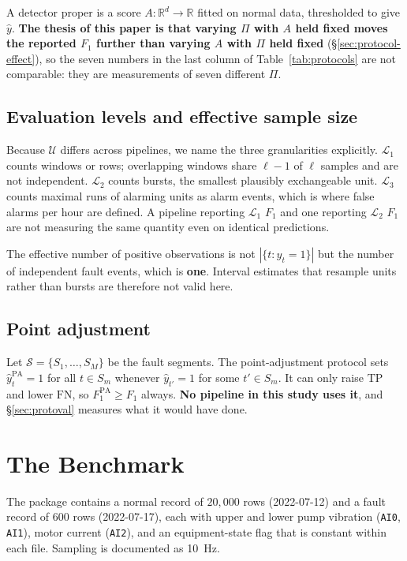 \documentclass{article}
\begin{document}
A detector proper is a score $A:\mathbb{R}^{d}\!\to\mathbb{R}$ fitted on normal
data, thresholded to give $\hat y$. \textbf{The thesis of this paper is that
varying $\Pi$ with $A$ held fixed moves the reported $F_1$ further than varying
$A$ with $\Pi$ held fixed} (\S\ref{sec:protocol-effect}), so the seven
numbers in the last column of Table~\ref{tab:protocols} are not comparable:
they are measurements of seven different $\Pi$.

\subsection{Evaluation levels and effective sample size}
\label{sub:levels}

Because $\mathcal{U}$ differs across pipelines, we name the three granularities
explicitly. $\mathcal{L}_1$ counts windows or rows; overlapping windows share
$\ell-1$ of $\ell$ samples and are not independent. $\mathcal{L}_2$ counts
bursts, the smallest plausibly exchangeable unit. $\mathcal{L}_3$ counts
maximal runs of alarming units as alarm events, which is where false alarms per
hour are defined. A pipeline reporting $\mathcal{L}_1$ $F_1$ and one reporting
$\mathcal{L}_2$ $F_1$ are not measuring the same quantity even on identical
predictions.

The effective number of positive observations is not $|\{t:y_t=1\}|$ but the
number of independent fault events, which is \textbf{one}. Interval estimates
that resample units rather than bursts are therefore not valid here.

\subsection{Point adjustment}
\label{sub:pa}

Let $\mathcal{S}=\{S_1,\dots,S_M\}$ be the fault segments. The point-adjustment
protocol \citep{kim2022towards} sets $\hat y^{\mathrm{PA}}_t=1$ for all $t\in
S_m$ whenever $\hat y_{t'}=1$ for some $t'\in S_m$. It can only raise
$\mathrm{TP}$ and lower $\mathrm{FN}$, so $F_1^{\mathrm{PA}}\ge F_1$ always.
\textbf{No pipeline in this study uses it}, and \S\ref{sec:protoval} measures
what it would have done.

\section{The Benchmark}
\label{sec:data}

The package contains a normal record of $20{,}000$ rows (2022-07-12) and a
fault record of $600$ rows (2022-07-17), each with upper and lower pump
vibration (\texttt{AI0}, \texttt{AI1}), motor current (\texttt{AI2}), and an
equipment-state flag that is constant within each file. Sampling is documented
as \SI{10}{\hertz}.
\end{document}
